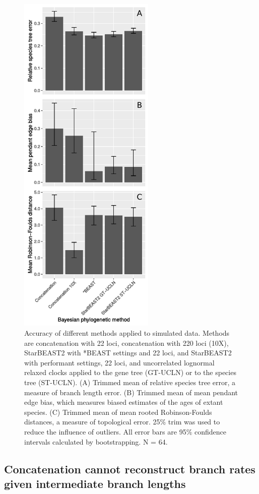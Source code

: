 \documentclass[12pt]{article}
\begin{document}
\begin{figure}[htb!]
\centering
\includegraphics[width=6.5cm]{tree_error.pdf}
\caption
{Accuracy of different methods applied to simulated data. Methods are concatenation with 22 loci, concatenation with 220 loci
(10X), StarBEAST2 with *BEAST settings and 22 loci, and StarBEAST2 with
performant settings, 22 loci, and uncorrelated lognormal relaxed clocks applied
to the gene tree (GT-UCLN) or to the species tree (ST-UCLN). (A) Trimmed mean of
relative species tree error, a measure of branch length error. (B) Trimmed
mean of mean pendant edge bias, which measures biased estimates of the ages of
extant species. (C) Trimmed mean of mean rooted Robinson-Foulds distances, a
measure of topological error. 25\% trim was used to reduce the
influence of outliers. All error bars are 95\% confidence intervals calculated
by bootstrapping. N = 64.}
\label{fig:speciesTreeError}
\end{figure}

\subsection{Concatenation cannot reconstruct branch rates given intermediate branch lengths}
\end{document}
